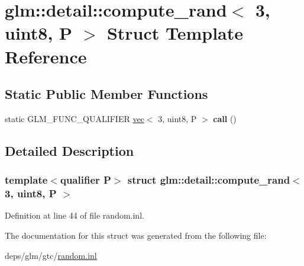 \hypertarget{structglm_1_1detail_1_1compute__rand_3_013_00_01uint8_00_01P_01_4}{}\section{glm\+:\+:detail\+:\+:compute\+\_\+rand$<$ 3, uint8, P $>$ Struct Template Reference}
\label{structglm_1_1detail_1_1compute__rand_3_013_00_01uint8_00_01P_01_4}
\subsection*{Static Public Member Functions}
\begin{DoxyCompactItemize}
\item 
\mbox{\label{structglm_1_1detail_1_1compute__rand_3_013_00_01uint8_00_01P_01_4_a1c4fe17e05c4f573144b285f20675ec5}} 
static G\+L\+M\+\_\+\+F\+U\+N\+C\+\_\+\+Q\+U\+A\+L\+I\+F\+I\+ER \hyperlink{structglm_1_1vec}{vec}$<$ 3, uint8, P $>$ {\bfseries call} ()
\end{DoxyCompactItemize}


\subsection{Detailed Description}
\subsubsection*{template$<$qualifier P$>$\newline
struct glm\+::detail\+::compute\+\_\+rand$<$ 3, uint8, P $>$}



Definition at line 44 of file random.\+inl.



The documentation for this struct was generated from the following file\+:\begin{DoxyCompactItemize}
\item 
deps/glm/gtc/\hyperlink{random_8inl}{random.\+inl}\end{DoxyCompactItemize}
